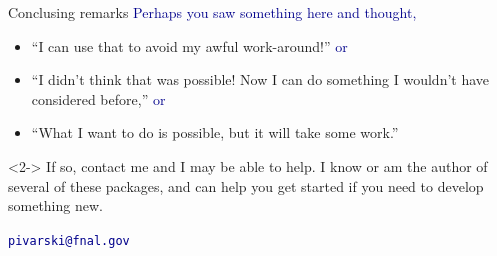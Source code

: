 \documentclass{beamer}
\begin{document}
\begin{frame}{Conclusing remarks}
\vfill
\vfill
\textcolor{darkblue}{Perhaps you saw something here and thought,}
\begin{itemize}
\item ``I can use that to avoid my awful work-around!'' \textcolor{darkblue}{or}
\item ``I didn't think that was possible! Now I can do something I wouldn't have considered before,'' \textcolor{darkblue}{or}
\item ``What I want to do is possible, but it will take some work.''
\end{itemize}

\vfill
\begin{uncoverenv}<2->
If so, contact me and I may be able to help. I know or am the author of several of these packages, and can help you get started if you need to develop something new.

\vfill
\begin{center}
\textcolor{darkblue}{\tt pivarski@fnal.gov}
\end{center}
\end{uncoverenv}
\end{frame}
\end{document}
